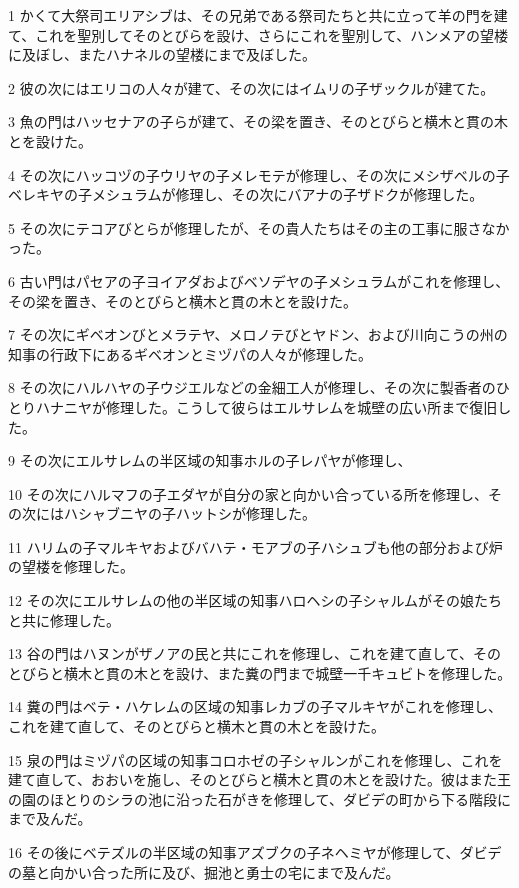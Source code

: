 \par 1 かくて大祭司エリアシブは、その兄弟である祭司たちと共に立って羊の門を建て、これを聖別してそのとびらを設け、さらにこれを聖別して、ハンメアの望楼に及ぼし、またハナネルの望楼にまで及ぼした。
\par 2 彼の次にはエリコの人々が建て、その次にはイムリの子ザックルが建てた。
\par 3 魚の門はハッセナアの子らが建て、その梁を置き、そのとびらと横木と貫の木とを設けた。
\par 4 その次にハッコヅの子ウリヤの子メレモテが修理し、その次にメシザベルの子ベレキヤの子メシュラムが修理し、その次にバアナの子ザドクが修理した。
\par 5 その次にテコアびとらが修理したが、その貴人たちはその主の工事に服さなかった。
\par 6 古い門はパセアの子ヨイアダおよびベソデヤの子メシュラムがこれを修理し、その梁を置き、そのとびらと横木と貫の木とを設けた。
\par 7 その次にギベオンびとメラテヤ、メロノテびとヤドン、および川向こうの州の知事の行政下にあるギベオンとミヅパの人々が修理した。
\par 8 その次にハルハヤの子ウジエルなどの金細工人が修理し、その次に製香者のひとりハナニヤが修理した。こうして彼らはエルサレムを城壁の広い所まで復旧した。
\par 9 その次にエルサレムの半区域の知事ホルの子レパヤが修理し、
\par 10 その次にハルマフの子エダヤが自分の家と向かい合っている所を修理し、その次にはハシャブニヤの子ハットシが修理した。
\par 11 ハリムの子マルキヤおよびバハテ・モアブの子ハシュブも他の部分および炉の望楼を修理した。
\par 12 その次にエルサレムの他の半区域の知事ハロヘシの子シャルムがその娘たちと共に修理した。
\par 13 谷の門はハヌンがザノアの民と共にこれを修理し、これを建て直して、そのとびらと横木と貫の木とを設け、また糞の門まで城壁一千キュビトを修理した。
\par 14 糞の門はベテ・ハケレムの区域の知事レカブの子マルキヤがこれを修理し、これを建て直して、そのとびらと横木と貫の木とを設けた。
\par 15 泉の門はミヅパの区域の知事コロホゼの子シャルンがこれを修理し、これを建て直して、おおいを施し、そのとびらと横木と貫の木とを設けた。彼はまた王の園のほとりのシラの池に沿った石がきを修理して、ダビデの町から下る階段にまで及んだ。
\par 16 その後にベテズルの半区域の知事アズブクの子ネヘミヤが修理して、ダビデの墓と向かい合った所に及び、掘池と勇士の宅にまで及んだ。
